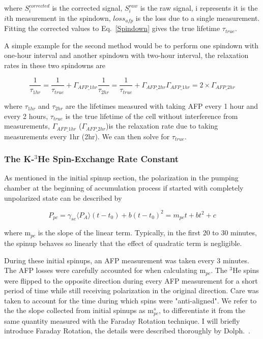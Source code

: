 where $S_{i}^{corrected}$ is the corrected signal, $S_{i}^{raw}$ is the raw signal, i represents it is the $i$th measurement in the spindown, $loss_{afp}$ is the loss due to a single measurement. Fitting the corrected values to Eq.~\ref{Spindown} gives the true lifetime $\tau_{true}$.

A simple example for the second method would be to perform one spindown with one-hour interval and another spindown with two-hour interval, the relaxation rates in these two spindowns are

\begin{subequations}
	\begin{equation}
	\frac{1}{\tau_{1hr}}=\frac{1}{\tau_{true}}+\Gamma_{AFP\_1hr}
	\end{equation}
	\begin{equation}
	\frac{1}{\tau_{2hr}}=\frac{1}{\tau_{true}}+\Gamma_{AFP\_2hr}
	\end{equation}
	\begin{equation}
	\Gamma_{AFP\_1hr}=2\times \Gamma_{AFP\_2hr}
	\end{equation}
\end{subequations}

where $\tau_{1hr}$ and $\tau_{2hr}$ are the lifetimes measured with taking AFP every 1 hour and every 2 hours, $\tau_{true}$ is the true lifetime of the cell without interference from measurements, $\Gamma_{AFP\_1hr}$ ($\Gamma_{AFP\_2hr}$)is the relaxation rate due to taking measurements every 1hr (2hr). We can then solve for $\tau_{true}$.

\subsubsection{The K-$^{3}$He Spin-Exchange Rate Constant}

As mentioned in the initial spinup section, the polarization in the pumping chamber at the beginning of accumulation process if started with completely unpolarized state can be described by 

\begin{equation}
P_{pc} = \gamma_{se}\langle P_{A}\rangle (t-t_{0})+b(t-t_{0})^{2} = m_{pc}t + bt^{2} + c
\end{equation}

where m$_{pc}$ is the slope of the linear term. Typically, in the first 20 to 30 minutes, the spinup behaves so linearly that the effect of quadratic term is negligible.

During these initial spinups, an AFP measurement was taken every 3 minutes. The AFP losses were carefully accounted for when calculating m$_{pc}$. The $^{3}$He spins were flipped to the opposite direction during every AFP measurement for a short period of time while still receiving polarization in the original direction. Care was taken to account for the time during which spins were "anti-aligned". We refer to the the slope collected from initial spinups as m$_{pc}^{s}$, to differentiate it from the same quantity measured with the Faraday Rotation technique. I will briefly introduce Faraday Rotation, the details were described thoroughly by Dolph.~\cite{PeterThesis}.

